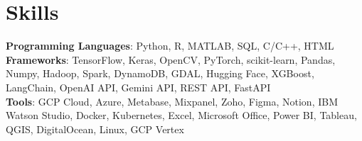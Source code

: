 \section{Skills}
    \begin{itemize}[leftmargin=0.15in, label={}]
	\small{\item{
		\textbf{Programming Languages}{: Python, R, MATLAB, SQL, C/C++, HTML} \\ 
        \textbf{Frameworks}{: TensorFlow, Keras, OpenCV, PyTorch, scikit-learn, Pandas, Numpy, Hadoop, Spark, DynamoDB, 
GDAL, Hugging Face, XGBoost, LangChain, OpenAI API, Gemini API, REST API, FastAPI
} \\
		\textbf{Tools}{: GCP Cloud, Azure, Metabase, Mixpanel, Zoho, Figma, Notion, IBM Watson Studio, Docker, Kubernetes, 
Excel, Microsoft Office, Power BI, Tableau, QGIS, DigitalOcean, Linux, GCP Vertex} \\
	}}
    \end{itemize}